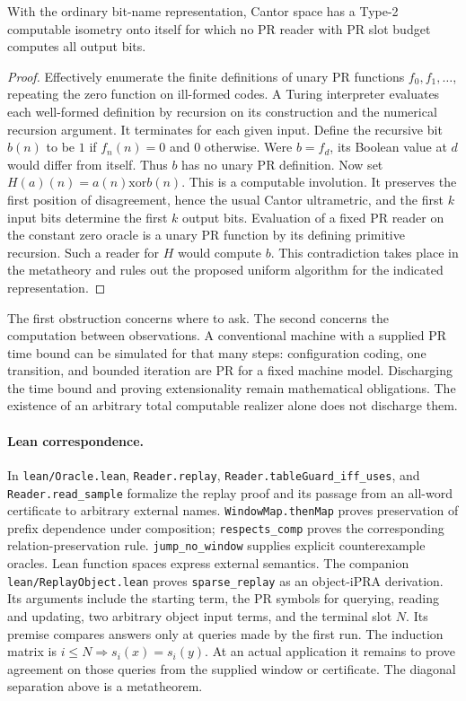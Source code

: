 \begin{proposition}
With the ordinary bit-name representation, Cantor space has a Type-2
computable isometry onto itself for which no PR reader with PR slot budget
computes all output bits.
\end{proposition}
\begin{proof}
Effectively enumerate the finite definitions of unary PR functions
$f_0,f_1,\ldots$, repeating the zero function on ill-formed codes. A
Turing interpreter evaluates each well-formed definition by recursion on
its construction and the numerical recursion argument. It terminates for
each given input. Define the recursive bit $b(n)$ to be $1$ if $f_n(n)=0$
and $0$ otherwise. Were $b=f_d$, its Boolean value at $d$ would differ
from itself. Thus $b$ has no unary PR definition. Now set
$H(a)(n)=a(n)\mathbin{\mathrm{xor}}b(n)$. This is a computable involution.
It preserves the first position of disagreement, hence the usual Cantor
ultrametric, and the first $k$ input bits determine the first $k$ output
bits. Evaluation of a fixed PR reader on the constant zero oracle is a
unary PR function by its defining primitive recursion. Such a reader for
$H$ would compute $b$. This contradiction takes place in the metatheory
and rules out the proposed uniform algorithm for the indicated representation.
\end{proof}
The first obstruction concerns where to ask. The second concerns the
computation between observations. A conventional machine with a supplied
PR time bound can be simulated for that many steps: configuration coding,
one transition, and bounded iteration are PR for a fixed machine model.
Discharging the time bound and proving extensionality remain mathematical
obligations. The existence of an arbitrary total computable realizer alone
does not discharge them.

\paragraph{Lean correspondence.}
In \texttt{lean/Oracle.lean}, \texttt{Reader.replay},
\texttt{Reader.tableGuard\_iff\_uses}, and \texttt{Reader.read\_sample}
formalize the replay proof and its passage from an all-word certificate
to arbitrary external names. \texttt{WindowMap.thenMap} proves preservation
of prefix dependence under composition; \texttt{respects\_comp} proves the
corresponding relation-preservation rule. \texttt{jump\_no\_window} supplies
explicit counterexample oracles. Lean function spaces express external
semantics. The companion \texttt{lean/ReplayObject.lean} proves
\texttt{sparse\_replay} as an object-iPRA derivation. Its arguments include
the starting term, the PR symbols for querying, reading and updating, two
arbitrary object input terms, and the terminal slot $N$. Its premise compares
answers only at queries made by the first run. The induction matrix is
$i\le N\Rightarrow s_i(x)=s_i(y)$. At an actual application it remains to
prove agreement on those queries from the supplied window or certificate.
The diagonal separation above is a metatheorem.
